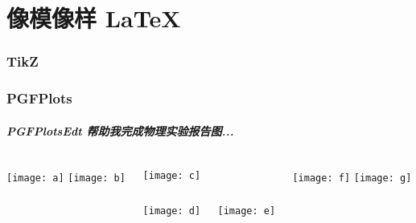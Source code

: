 
\part{像模像样 \LaTeX{}}

\section{TikZ}



\section{PGFPlots}

\begin{frame}
    \frametitle{PGFPlotsEdt 帮助我完成物理实验报告图...}
    \begin{columns}
        \begin{column}{0.25\textwidth}
            \texttt{[image: a]}
            \texttt{[image: b]}
        \end{column}
        \begin{column}{0.50\textwidth}
            \texttt{[image: c]}
            \begin{columns}
                \begin{column}{0.5\linewidth}
                    \texttt{[image: d]}
                \end{column}
                \begin{column}{0.5\linewidth}
                    \texttt{[image: e]}
                \end{column}
            \end{columns}
        \end{column}
        \begin{column}{0.25\textwidth}
            \texttt{[image: f]}
            \texttt{[image: g]}
        \end{column}
    \end{columns}
\end{frame}